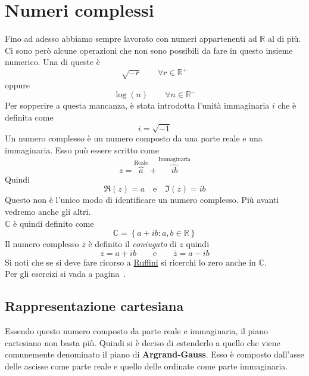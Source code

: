 
\section{Numeri complessi}\label{sec:complex}
Fino ad adesso abbiamo sempre lavorato con numeri appartenenti ad $\mathbb{R}$ al di più. Ci sono però
alcune operazioni che non sono possibili da fare in questo insieme numerico. Una di queste è
\begin{equation*}
  \sqrt{-r}\qquad\forall r\in\mathbb{R}^+
\end{equation*}
oppure
\begin{equation*}
  \log(n)\qquad \forall n\in\mathbb{R}^-
\end{equation*}
Per sopperire a questa mancanza, è stata introdotta l'unità immaginaria $i$ che è definita come
\begin{equation*}
  i=\sqrt{-1}
\end{equation*}
Un numero complesso è un numero composto da una parte reale e una immaginaria. Esso può essere scritto
come
\begin{equation*}
  z = \overbrace{a}^{\text{Reale}} + \overbrace{ib}^{\text{Immaginaria}}
\end{equation*}
Quindi
\begin{equation*}
  \Re(z) = a \quad\text{e}\quad\Im(z)=ib
\end{equation*}
Questo non è l'unico modo di identificare un numero complesso. Più avanti vedremo anche gli altri.\\
$\mathbb{C}$ è quindi definito come
\begin{equation*}
  \mathbb{C}=\left\{a+ib: a,b\in\mathbb{R}\right\}
\end{equation*}
Il numero complesso $\bar{z}$ è definito il \textit{coniugato} di $z$ quindi
\begin{equation*}
  z=a+ib\qquad\text{e}\qquad\bar{z}=a-ib
\end{equation*}
Si noti che se si deve fare ricorso a \hyperref[ruffini]{Ruffini} si ricerchi lo zero anche in 
$\mathbb{C}$.\\
Per gli esercizi si vada a pagina~\pageref{ex:complex}.

\subsection{Rappresentazione cartesiana}\label{subsec:complex:cart}
Essendo questo numero composto da parte reale e immaginaria, il piano cartesiano non basta più. Quindi 
si è deciso di estenderlo a quello che viene comunemente denominato il piano di \textbf{Argrand-Gauss}.
Esso è composto dall'asse delle ascisse come parte reale e quello delle ordinate come parte 
immaginaria.

